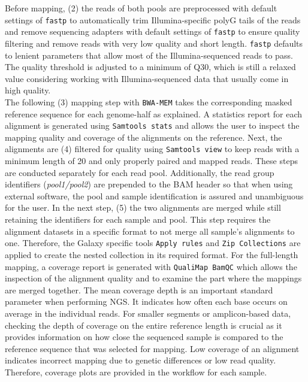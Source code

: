 Before mapping, (2) the reads of both pools are preprocessed with default settings of \texttt{fastp} to automatically trim Illumina-specific polyG tails of the reads and remove sequencing adapters with default settings of \texttt{fastp} to ensure quality filtering and remove reads with very low quality and short length. \texttt{fastp} defaults to lenient parameters that allow most of the Illumina-sequenced reads to pass. The quality threshold is adjusted to a minimum of Q30, which is still a relaxed value considering working with Illumina-sequenced data that usually come in high quality.\\
The following (3) mapping step with \texttt{BWA-MEM} takes the corresponding masked reference sequence for each genome-half as explained. A statistics report for each alignment is generated using \texttt{Samtools stats} and allows the user to inspect the mapping quality and coverage of the alignments on the reference. Next, the alignments are (4) filtered for quality using \texttt{Samtools view} to keep reads with a minimum length of 20 and only properly paired and mapped reads. These steps are conducted separately for each read pool. Additionally, the read group identifiers (\textit{pool1/pool2}) are prepended to the \ac{BAM} header so that when using external software, the pool and sample identification is assured and unambiguous for the user. In the next step, (5) the two alignments are merged while still retaining the identifiers for each sample and pool. This step requires the alignment datasets in a specific format to not merge all sample's alignments to one. Therefore, the Galaxy specific tools \texttt{Apply rules} and \texttt{Zip Collections} are applied to create the nested collection in its required format. For the full-length mapping, a coverage report is generated with \texttt{QualiMap BamQC} which allows the inspection of the alignment quality and to examine the part where the mappings are merged together. The mean coverage depth is an important standard parameter when performing \ac{NGS}. It indicates how often each base occurs on average in the individual reads. For smaller segments or amplicon-based data, checking the depth of coverage on the entire reference length is crucial as it provides information on how close the sequenced sample is compared to the reference sequence that was selected for mapping. Low coverage of an alignment indicates incorrect mapping due to genetic differences or low read quality. Therefore, coverage plots are provided in the workflow for each sample.\\
